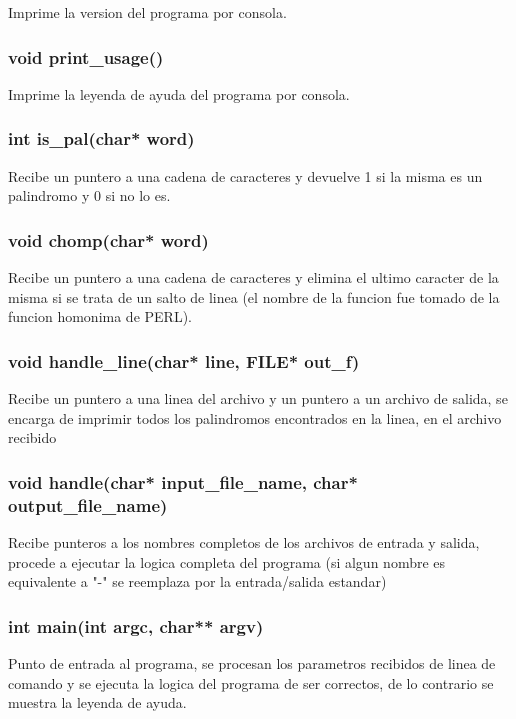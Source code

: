 \documentclass[10pt,a4paper]{article}
\begin{document}
Imprime la version del programa por consola.

\subsubsection{void print\_usage()}

Imprime la leyenda de ayuda del programa por consola.

\subsubsection{int is\_pal(char* word)}

Recibe un puntero a una cadena de caracteres y devuelve 1 si la misma es un palindromo y 0 si no lo es.

\subsubsection{void chomp(char* word)}

Recibe un puntero a una cadena de caracteres y elimina el ultimo caracter de la misma si se trata de un salto de linea (el nombre de la funcion fue tomado de la funcion homonima de PERL).

\subsubsection{void handle\_line(char* line, FILE* out\_f)}

Recibe un puntero a una linea del archivo y un puntero a un archivo de salida, se encarga de imprimir todos los palindromos encontrados en la linea, en el archivo recibido

\subsubsection{void handle(char* input\_file\_name, char* output\_file\_name)}

Recibe punteros a los nombres completos de los archivos de entrada y salida, procede a ejecutar la logica completa del programa (si algun nombre es equivalente a "-" se reemplaza por la entrada/salida estandar)

\subsubsection{int main(int argc, char** argv)}

Punto de entrada al programa, se procesan los parametros recibidos de linea de comando y se ejecuta la logica del programa de ser correctos, de lo contrario se muestra la leyenda de ayuda.
\end{document}
